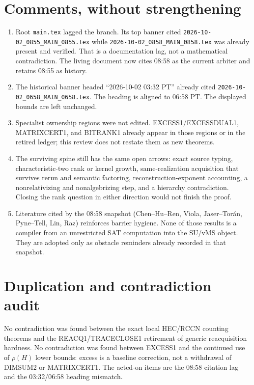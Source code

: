 \documentclass[11pt]{article}
\begin{document}
\section*{Comments, without strengthening}
\begin{enumerate}
\item Root \texttt{main.tex} lagged the branch. Its top banner cited
\texttt{2026-10-02\_0855\_MAIN\_0855.tex} while
\texttt{2026-10-02\_0858\_MAIN\_0858.tex} was already present and verified.
That is a documentation lag, not a mathematical contradiction. The living
document now cites 08:58 as the current arbiter and retains 08:55 as history.
\item The historical banner headed ``2026-10-02 03:32 PT'' already cited
\texttt{2026-10-02\_0658\_MAIN\_0658.tex}. The heading is aligned to 06:58 PT.
The displayed bounds are left unchanged.
\item Specialist ownership regions were not edited. EXCESS1/EXCESSDUAL1,
MATRIXCERT1, and BITRANK1 already appear in those regions or in the retired
ledger; this review does not restate them as new theorems.
\item The surviving spine still has the same open arrows: exact source typing,
characteristic-two rank or kernel growth, same-realization acquisition that
survives rerun and semantic factoring, reconstruction-exponent accounting, a
nonrelativizing and nonalgebrizing step, and a hierarchy contradiction.
Closing the rank question in either direction would not finish the proof.
\item Literature cited by the 08:58 snapshot (Chen--Hu--Ren, Viola, Jaser--Tor\'an,
Pyne--Tell, Lin, Raz) reinforces barrier hygiene. None of those results is a
compiler from an unrestricted SAT computation into the SU/vMS object. They are
adopted only as obstacle reminders already recorded in that snapshot.
\end{enumerate}

\section*{Duplication and contradiction audit}
No contradiction was found between the exact local HEC/RCCN counting theorems and
the REACQ1/TRACECLOSE1 retirement of generic reacquisition hardness. No
contradiction was found between EXCESS1 and the continued use of
\(\rho(H)\) lower bounds: excess is a baseline correction, not a withdrawal of
DIMSUM2 or MATRIXCERT1. The acted-on items are the 08:58 citation lag and the
03:32/06:58 heading mismatch.
\end{document}
